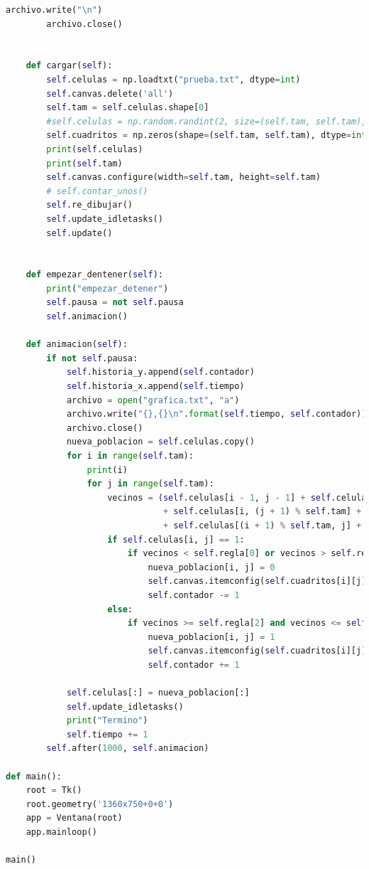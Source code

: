 \begin{lstlisting}[language=Python]
        archivo.write("\n")
        archivo.close()


    def cargar(self):
        self.celulas = np.loadtxt("prueba.txt", dtype=int)
        self.canvas.delete('all')
        self.tam = self.celulas.shape[0]
        #self.celulas = np.random.randint(2, size=(self.tam, self.tam), dtype=int)
        self.cuadritos = np.zeros(shape=(self.tam, self.tam), dtype=int)
        print(self.celulas)
        print(self.tam)
        self.canvas.configure(width=self.tam, height=self.tam)
        # self.contar_unos()
        self.re_dibujar()
        self.update_idletasks()
        self.update()


    def empezar_dentener(self):
        print("empezar_detener")
        self.pausa = not self.pausa
        self.animacion()

    def animacion(self):
        if not self.pausa:
            self.historia_y.append(self.contador)
            self.historia_x.append(self.tiempo)
            archivo = open("grafica.txt", "a")
            archivo.write("{},{}\n".format(self.tiempo, self.contador))
            archivo.close()
            nueva_poblacion = self.celulas.copy()
            for i in range(self.tam):
                print(i)
                for j in range(self.tam):
                    vecinos = (self.celulas[i - 1, j - 1] + self.celulas[i - 1, j] + self.celulas[i - 1, (j + 1) % self.tam]
                               + self.celulas[i, (j + 1) % self.tam] + self.celulas[(i + 1) % self.tam, (j + 1) % self.tam]
                               + self.celulas[(i + 1) % self.tam, j] + self.celulas[(i + 1) % self.tam, j - 1] + self.celulas[i, j - 1])
                    if self.celulas[i, j] == 1:
                        if vecinos < self.regla[0] or vecinos > self.regla[1]:
                            nueva_poblacion[i, j] = 0
                            self.canvas.itemconfig(self.cuadritos[i][j], fill=self.ceros)
                            self.contador -= 1
                    else:
                        if vecinos >= self.regla[2] and vecinos <= self.regla[3]:
                            nueva_poblacion[i, j] = 1
                            self.canvas.itemconfig(self.cuadritos[i][j], fill=self.unos)
                            self.contador += 1

            self.celulas[:] = nueva_poblacion[:]
            self.update_idletasks()
            print("Termino")
            self.tiempo += 1
        self.after(1000, self.animacion)

def main():
    root = Tk()
    root.geometry('1360x750+0+0')
    app = Ventana(root)
    app.mainloop()

main()
\end{lstlisting}

